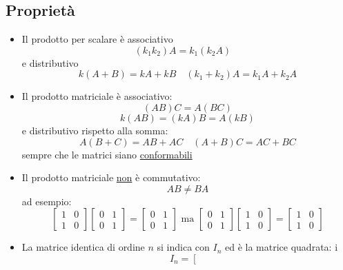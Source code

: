 \subsection{Proprietà}
\begin{itemize}
	\item Il prodotto per scalare è associativo
	      \[
		      \left( k_1k_2 \right) A = k_1\left( k_2A \right) \quad
	      \]
	      e distributivo
	      \[
		      k \left( A + B  \right) = kA + kB \quad
		      \left( k_1 + k_2 \right) A = k_1 A + k_2 A
	      \]
	\item Il prodotto matriciale è associativo:
	      \[
		      \left( AB \right) C = A \left( BC \right)
	      \]
	      \[
		      k \left( AB  \right) = \left( k A  \right) B = A \left( kB \right)
	      \]
	      e distributivo rispetto alla somma:
	      \[
		      A \left( B+C \right)  = AB + AC \quad \left( A+B \right) C = AC + BC
	      \]
	      sempre che le matrici siano  \underline{conformabili}
	\item Il prodotto matriciale \underline{non} è commutativo:
	      \[
		      AB \neq BA
	      \]
	      ad esempio:
	      $$
		      \left[\begin{array}{ll}
				      1 & 0 \\
				      1 & 0
			      \end{array}\right]\left[\begin{array}{ll}
				      0 & 1 \\
				      0 & 1
			      \end{array}\right]=\left[\begin{array}{ll}
				      0 & 1 \\
				      0 & 1
			      \end{array}\right] \text { ma }\left[\begin{array}{ll}
				      0 & 1 \\
				      0 & 1
			      \end{array}\right]\left[\begin{array}{ll}
				      1 & 0 \\
				      1 & 0
			      \end{array}\right]=\left[\begin{array}{ll}
				      1 & 0 \\
				      1 & 0
			      \end{array}\right]
	      $$
	\item La matrice identica di ordine $n$ si indica con $I_n$ ed è la matrice quadrata:
	      i
	      $$
		      I_n=\left[\begin{array}{cccc}

\end{array}$$
\end{itemize}

